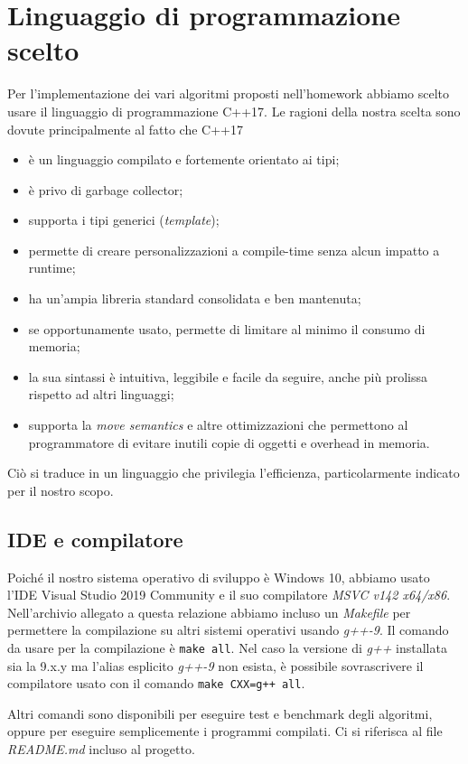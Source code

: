 \section{Linguaggio di programmazione scelto}
\label{cap:language-choice}

Per l'implementazione dei vari algoritmi proposti nell'homework abbiamo scelto usare il linguaggio di programmazione
C++17. Le ragioni della nostra scelta sono dovute principalmente al fatto che C++17

\begin{itemize}
    \item è un linguaggio compilato e fortemente orientato ai tipi;
    \item è privo di garbage collector;
    \item supporta i tipi generici (\textit{template});
    \item permette di creare personalizzazioni a compile-time senza alcun impatto a runtime;
    \item ha un'ampia libreria standard consolidata e ben mantenuta;
    \item se opportunamente usato, permette di limitare al minimo il consumo di memoria;
    \item la sua sintassi è intuitiva, leggibile e facile da seguire, anche più prolissa rispetto ad altri linguaggi;
    \item supporta la \textit{move semantics} e altre ottimizzazioni che permettono al programmatore di evitare inutili copie di oggetti e overhead in memoria.
\end{itemize}
Ciò si traduce in un linguaggio che privilegia l'efficienza, particolarmente indicato per il nostro scopo.

\subsection{IDE e compilatore}

Poiché il nostro sistema operativo di sviluppo è Windows 10, abbiamo usato l'IDE Visual Studio 2019 Community e il suo compilatore \textit{MSVC v142 x64/x86}. \\

\noindent Nell'archivio allegato a questa relazione abbiamo incluso un \textit{Makefile} per permettere la compilazione su altri sistemi operativi usando \textit{g++-9}. Il comando da usare per la compilazione è \texttt{make all}. Nel caso la versione di \textit{g++} installata sia la 9.x.y ma l'alias esplicito \textit{g++-9} non esista, è possibile sovrascrivere il compilatore usato con il comando \texttt{make CXX=g++ all}.

Altri comandi sono disponibili per eseguire test e benchmark degli algoritmi, oppure per eseguire semplicemente i programmi compilati. Ci si riferisca al file \textit{README.md} incluso al progetto.
